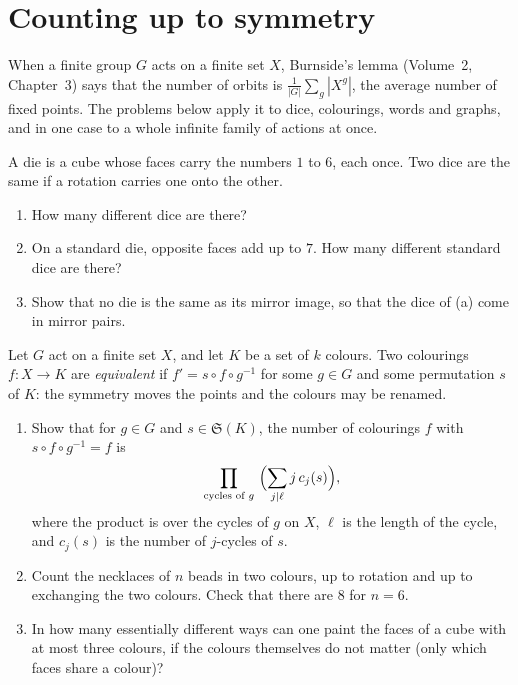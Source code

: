 \section{Counting up to symmetry}

When a finite group $G$ acts on a finite set $X$, Burnside's lemma (Volume~2, Chapter~3) says that the number of orbits is
$\frac1{|G|}\sum_g|X^g|$, the average number of fixed points. The problems below apply it to dice, colourings, words and
graphs, and in one case to a whole infinite family of actions at once.

\begin{exercise}[$\star$]\label{pb:dice}
A die is a cube whose faces carry the numbers $1$ to $6$, each once. Two dice are the same if a rotation carries one onto the
other.
\begin{enumerate}[label=(\alph*)]
\item How many different dice are there?
\item On a standard die, opposite faces add up to $7$. How many different standard dice are there?
\item Show that no die is the same as its mirror image, so that the dice of (a) come in mirror pairs.
\end{enumerate}
\end{exercise}

\begin{exercise}[$\star\star$]\label{pb:patterns}
Let $G$ act on a finite set $X$, and let $K$ be a set of $k$ colours. Two colourings $f:X\to K$ are \emph{equivalent} if
$f'=s\circ f\circ g^{-1}$ for some $g\in G$ and some permutation $s$ of $K$: the symmetry moves the points and the colours may
be renamed.
\begin{enumerate}[label=(\alph*)]
\item Show that for $g\in G$ and $s\in\mathfrak S(K)$, the number of colourings $f$ with $s\circ f\circ g^{-1}=f$ is
\[
\prod_{\text{cycles of }g}\ \Bigl(\sum_{j\mid\ell}j\,c_j(s)\Bigr),
\]
where the product is over the cycles of $g$ on $X$, $\ell$ is the length of the cycle, and $c_j(s)$ is the number of $j$-cycles
of $s$.
\item Count the necklaces of $n$ beads in two colours, up to rotation and up to exchanging the two colours. Check that there
are $8$ for $n=6$.
\item In how many essentially different ways can one paint the faces of a cube with at most three colours, if the colours
themselves do not matter (only which faces share a colour)?
\end{enumerate}
\end{exercise}


